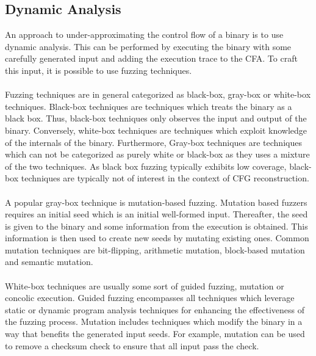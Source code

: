 \documentclass{kththesis}
\newcommand{\fbcomment}[1]{{#1}}
\renewcommand{\fbcomment}[1]{}
\begin{document}
\subsection{Dynamic Analysis}
\fbcomment{\color{red}Goal: Describe different alternatives to directed symbolic execution and why directed symbolic execution was selected(For example, the example of "if(x=2)")}
An approach to under-approximating the control flow of a binary is to use dynamic analysis. This can be performed by executing the binary with some carefully generated input and adding the execution trace to the CFA. To craft this input, it is possible to use fuzzing techniques.
\\ \\
Fuzzing techniques are in general categorized as black-box, gray-box or white-box techniques\cite{fuzzingSurvey}. Black-box techniques are techniques which treats the binary as a black box. Thus, black-box techniques only observes the input and output of the binary. Conversely, white-box techniques are techniques which exploit knowledge of the internals of the binary. Furthermore, Gray-box techniques are techniques which can not be categorized as purely white or black-box as they uses a mixture of the two techniques. As black box fuzzing typically exhibits low coverage, black-box techniques are typically not of interest in the context of CFG reconstruction\cite{fuzzingSurvey}.
\\ \\
A popular gray-box technique is mutation-based fuzzing. Mutation based fuzzers requires an initial seed which is an initial well-formed input. Thereafter, the seed is given to the binary and some information from the execution is obtained. This information is then used to create new seeds by mutating existing ones. Common mutation techniques are bit-flipping, arithmetic mutation, block-based mutation and semantic mutation\cite{fuzzingSurvey}.
\\ \\ 
White-box techniques are usually some sort of guided fuzzing, mutation or concolic execution\cite{fuzzingSurvey}. Guided fuzzing encompasses all techniques which leverage static or dynamic program analysis techniques for enhancing the effectiveness of the fuzzing process. Mutation includes techniques which modify the binary in a way that benefits the generated input seeds. For example, mutation can be used to remove a checksum check to ensure that all input pass the check\cite{fuzzingSurvey}.
\\ \\
\end{document}
